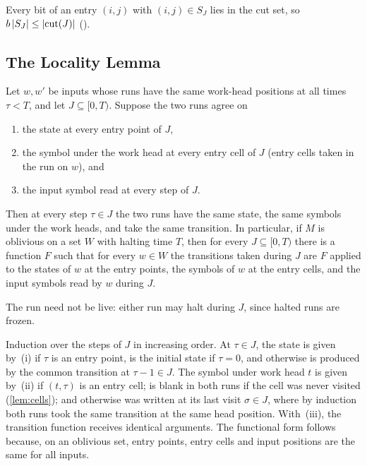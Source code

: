 Every bit of an entry $(i,j)$ with $(i,j)\in S_J$ lies in the cut set, so
$b\,\lvert S_J \rvert\le\lvert \mathrm{cut}(J) \rvert$ ().

\subsection{The Locality Lemma}

\begin{lemma}[Locality]\label{lem:locality}
Let $w,w'$ be inputs whose runs have the same work-head positions at all times $\tau<T$, and let
$J\subseteq[0,T)$. Suppose the two runs agree on
\begin{enumerate}[label=(\roman*)]
\item the state at every entry point of $J$,
\item the symbol under the work head at every entry cell of $J$ (entry cells taken in the run on
$w$), and
\item the input symbol read at every step of $J$.
\end{enumerate}
Then at every step $\tau\in J$ the two runs have the same state, the same symbols under the work
heads, and take the same transition. In particular, if $M$ is oblivious on a set $W$ with halting
time $T$, then for every $J\subseteq[0,T)$ there is a function $F$ such that for every $w\in W$
the transitions taken during $J$ are $F$ applied to the states of $w$ at the entry points, the
symbols of $w$ at the entry cells, and the input symbols read by $w$ during $J$.
\end{lemma}

The run need not be live: either run may halt during $J$, since halted runs are frozen.

\begin{outline}
Induction over the steps of $J$ in increasing order. At $\tau\in J$, the state is given by~(i)
if $\tau$ is an entry point, is the initial state if $\tau=0$, and otherwise is produced by the common
transition at $\tau-1\in J$.
The symbol under work head $t$ is given by~(ii) if $(t,\tau)$ is an entry cell; is blank in both
runs if the cell was never visited (\cref{lem:cells}); and otherwise was written at its last visit
$\sigma\in J$, where by induction both runs took the same transition at the same head position.
With~(iii), the transition function receives identical arguments. The functional form follows
because, on an oblivious set, entry points, entry cells and input positions are the same for all
inputs.
\end{outline}

